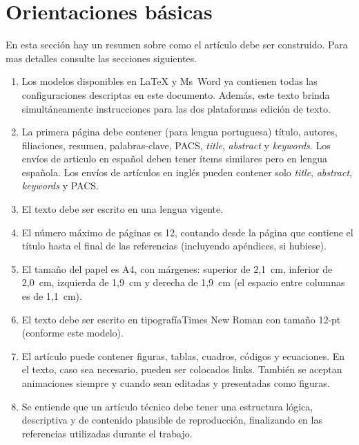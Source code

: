 \documentclass[12pt, a4paper, twoside, twocolumn]{article}
\begin{document}
\section{Orientaciones básicas}


En esta sección hay un resumen sobre como el artículo debe ser construido. Para mas detalles consulte las secciones siguientes.

\vspace{-8pt}
\begin{enumerate} \itemsep=2pt
    \item Los modelos disponibles en LaTeX y Ms~Word ya contienen todas las configuraciones descriptas en este documento. Además, este texto brinda simultáneamente instrucciones para las dos plataformas edición de texto.
	\item La primera página debe contener (para lengua portuguesa) título, autores, filiaciones, resumen, palabras-clave, PACS, \textit{title}, \textit{abstract} y \textit{keywords}. Los envíos de articulo en español deben tener ítems similares pero en lengua española. Los envíos de artículos en inglés pueden contener solo \textit{title}, \textit{abstract}, \textit{keywords} y PACS.
	\item El texto debe ser escrito en una lengua vigente.
	\item El número máximo de páginas es 12, contando desde la página que contiene el título hasta el final de las referencias (incluyendo apéndices, si hubiese).
	\item El tamaño del papel es A4, con márgenes: superior de 2,1~cm, inferior de 2,0~cm, izquierda de 1,9~cm y derecha de 1,9~cm (el espacio entre columnas es de 1,1~cm).
	\item El texto debe ser escrito en tipografía\linebreak Times New Roman con tamaño 12-pt (conforme este modelo).
	\item El artículo puede contener figuras, tablas, cuadros, códigos y ecuaciones. En el texto, caso sea necesario, pueden ser colocados links. También se aceptan animaciones siempre y cuando sean editadas y presentadas como figuras.
	\item Se entiende que un artículo técnico debe tener una estructura lógica, descriptiva y de contenido plausible de reproducción, finalizando en las referencias utilizadas durante el trabajo.
\end{enumerate}
\end{document}

